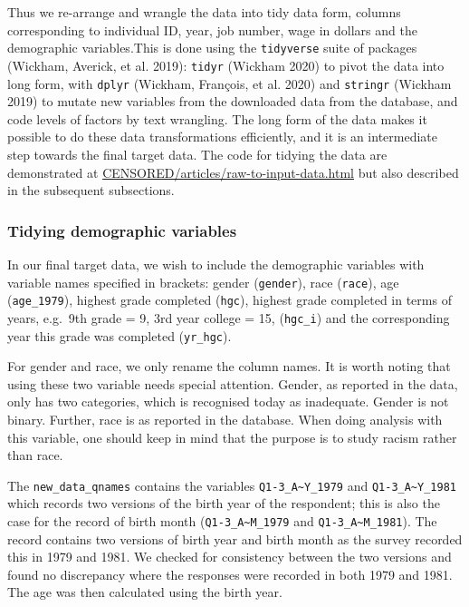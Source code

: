 \documentclass{article}
\begin{document}
Thus we re-arrange and wrangle the data into tidy data form, columns corresponding to individual ID, year, job number, wage in dollars and the demographic variables.This is done using the \texttt{tidyverse} suite of packages (Wickham, Averick, et al. 2019): \texttt{tidyr} (Wickham 2020) to pivot the data into long form, with \texttt{dplyr} (Wickham, François, et al. 2020) and \texttt{stringr} (Wickham 2019) to mutate new variables from the downloaded data from the database, and code levels of factors by text wrangling. The long form of the data makes it possible to do these data transformations efficiently, and it is an intermediate step towards the final target data. The code for tidying the data are demonstrated at \url{CENSORED/articles/raw-to-input-data.html} but also described in the subsequent subsections.

\hypertarget{tidydemog}{%
\subsubsection{Tidying demographic variables}\label{tidydemog}}

In our final target data, we wish to include the demographic variables with variable names specified in brackets: gender (\texttt{gender}), race (\texttt{race}), age (\texttt{age\_1979}), highest grade completed (\texttt{hgc}), highest grade completed in terms of years, e.g.~9th grade = 9, 3rd year college = 15, (\texttt{hgc\_i}) and the corresponding year this grade was completed (\texttt{yr\_hgc}).

For gender and race, we only rename the column names. It is worth noting that using these two variable needs special attention. Gender, as reported in the data, only has two categories, which is recognised today as inadequate. Gender is not binary. Further, race is as reported in the database. When doing analysis with this variable, one should keep in mind that the purpose is to study racism rather than race.

The \texttt{new\_data\_qnames} contains the variables \texttt{Q1-3\_A\textasciitilde{}Y\_1979} and \texttt{Q1-3\_A\textasciitilde{}Y\_1981} which records two versions of the birth year of the respondent; this is also the case for the record of birth month (\texttt{Q1-3\_A\textasciitilde{}M\_1979} and \texttt{Q1-3\_A\textasciitilde{}M\_1981}). The record contains two versions of birth year and birth month as the survey recorded this in 1979 and 1981. We checked for consistency between the two versions and found no discrepancy where the responses were recorded in both 1979 and 1981. The age was then calculated using the birth year.
\end{document}
